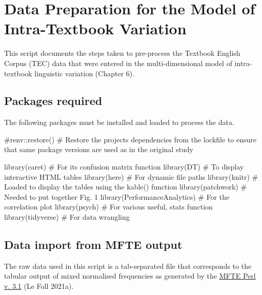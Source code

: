 \documentclass[
  letterpaper,
  DIV=11,
  numbers=noendperiod]{scrreprt}
\newenvironment{Shaded}{\begin{snugshade}}{\end{snugshade}}
\newcommand{\CommentTok}[1]{\textcolor[rgb]{0.37,0.37,0.37}{#1}}
\newcommand{\FunctionTok}[1]{\textcolor[rgb]{0.28,0.35,0.67}{#1}}
\newcommand{\NormalTok}[1]{\textcolor[rgb]{0.00,0.23,0.31}{#1}}
\begin{document}
\chapter{Data Preparation for the Model of Intra-Textbook
Variation}\label{data-preparation-for-the-model-of-intra-textbook-variation}

This script documents the steps taken to pre-process the Textbook
English Corpus (TEC) data that were entered in the multi-dimensional
model of intra-textbook linguistic variation (Chapter 6).

\section{Packages required}\label{packages-required}

The following packages must be installed and loaded to process the data.

\begin{Shaded}
\begin{Highlighting}[]
\CommentTok{\#renv::restore() \# Restore the project\textquotesingle{}s dependencies from the lockfile to ensure that same package versions are used as in the original study}

\FunctionTok{library}\NormalTok{(caret) }\CommentTok{\# For its confusion matrix function}
\FunctionTok{library}\NormalTok{(DT) }\CommentTok{\# To display interactive HTML tables}
\FunctionTok{library}\NormalTok{(here) }\CommentTok{\# For dynamic file paths}
\FunctionTok{library}\NormalTok{(knitr) }\CommentTok{\# Loaded to display the tables using the kable() function}
\FunctionTok{library}\NormalTok{(patchwork) }\CommentTok{\# Needed to put together Fig. 1}
\FunctionTok{library}\NormalTok{(PerformanceAnalytics) }\CommentTok{\# For the correlation plot}
\FunctionTok{library}\NormalTok{(psych) }\CommentTok{\# For various useful, stats function}
\FunctionTok{library}\NormalTok{(tidyverse) }\CommentTok{\# For data wrangling}
\end{Highlighting}
\end{Shaded}

\section{Data import from MFTE
output}\label{data-import-from-mfte-output}

The raw data used in this script is a tab-separated file that
corresponds to the tabular output of mixed normalised frequencies as
generated by the
\href{https://github.com/mshakirDr/MultiFeatureTaggerEnglish}{MFTE Perl
v. 3.1} (Le Foll 2021a).
\end{document}

